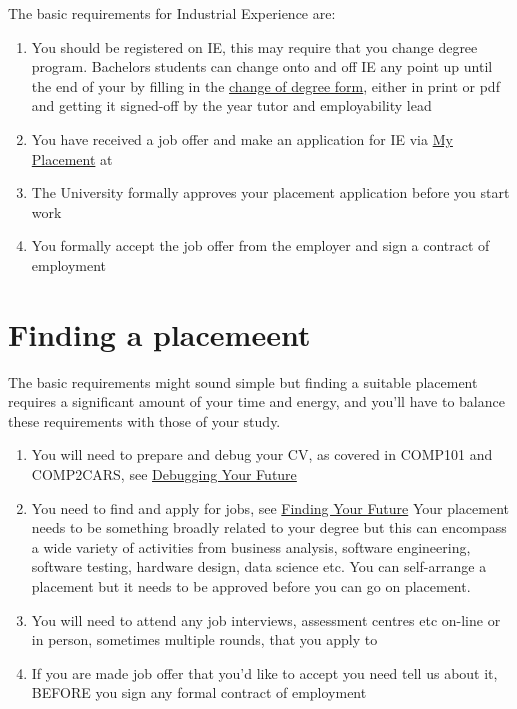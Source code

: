 \documentclass[
]{book}
\providecommand{\tightlist}{%
  \setlength{\itemsep}{0pt}\setlength{\parskip}{0pt}}
\begin{document}
The basic requirements for Industrial Experience are:

\begin{enumerate}
\def\labelenumi{\arabic{enumi}.}
\tightlist
\item
  You should be registered on IE, this may require that you change degree program. Bachelors students can change onto and off IE any point up until the end of your by filling in the \href{https://studentnet.cs.manchester.ac.uk/ugt/changedegree.php}{change of degree form}, either in print or pdf and getting it signed-off by the year tutor and employability lead \citep{changedegree}
\item
  You have received a job offer and make an application for IE via \href{https://studentmobility.manchester.ac.uk}{My Placement} at \citep{myplacement}
\item
  The University formally approves your placement application before you start work
\item
  You formally accept the job offer from the employer and sign a contract of employment
\end{enumerate}

\section{Finding a placemeent}\label{finding}

The basic requirements might sound simple but finding a suitable placement requires a significant amount of your time and energy, and you'll have to balance these requirements with those of your study.

\begin{enumerate}
\def\labelenumi{\arabic{enumi}.}
\tightlist
\item
  You will need to prepare and debug your CV, as covered in COMP101 and COMP2CARS, see \href{https://www.cdyf.me/debugging}{Debugging Your Future} \citep{debugging}
\item
  You need to find and apply for jobs, see \href{https://www.cdyf.me/finding}{Finding Your Future} \citep{finding} Your placement needs to be something broadly related to your degree but this can encompass a wide variety of activities from business analysis, software engineering, software testing, hardware design, data science etc. You can self-arrange a placement but it needs to be approved before you can go on placement.
\item
  You will need to attend any job interviews, assessment centres etc on-line or in person, sometimes multiple rounds, that you apply to
\item
  If you are made job offer that you'd like to accept you need tell us about it, BEFORE you sign any formal contract of employment
\end{enumerate}
\end{document}
